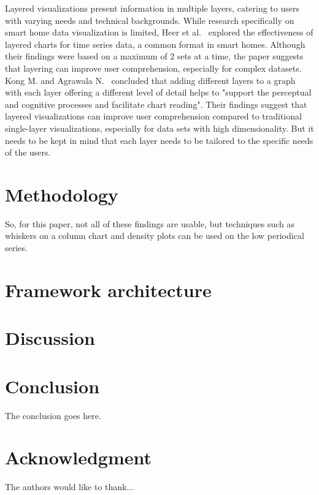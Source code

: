 \documentclass[journal]{IEEEtran}
\begin{document}
Layered visualizations present information in multiple layers, catering to users with varying needs and technical backgrounds. While research specifically on smart home data visualization is limited, Heer et al.~\cite{Heer2009SizingVisualizations} explored the effectiveness of layered charts for time series data, a common format in smart homes. Although their findings were based on a maximum of 2 sets at a time, the paper suggests that layering can improve user comprehension, especially for complex datasets. Kong M. and Agrawala N.~\cite{Kong2012GraphicalReading} concluded that adding different layers to a graph with each layer offering a different level of detail helps to "support the perceptual and cognitive processes and facilitate chart reading". Their findings suggest that layered visualizations can improve user comprehension compared to traditional single-layer visualizations, especially for data sets with high dimensionality. But it needs to be kept in mind that each layer needs to be tailored to the specific needs of the users.

\section{Methodology} %

So, for this paper, not all of these findings are usable, but techniques such as whiskers on a column chart and density plots can be used on the low periodical series.

\section{Framework architecture} %


\section{Discussion} %

\section{Conclusion}
The conclusion goes here.


\section*{Acknowledgment}


The authors would like to thank...






\end{document}
